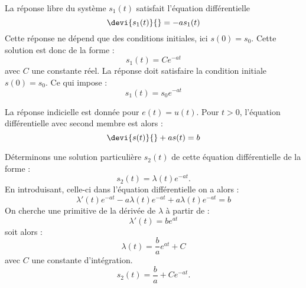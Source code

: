 La réponse libre du système $s_1(t)$ satisfait l'équation différentielle
$$
\devi{s_1(t)}{}=-as_1(t)
$$
Cette réponse ne dépend que des conditions initiales, ici $s(0)=s_0$.
Cette solution est donc de la forme :
$$
s_1(t)=Ce^{-at}
$$
avec $C$ une constante réel. La réponse doit satisfaire la condition initiale $s(0)=s_0$.
Ce qui impose :
$$
s_1(t)=s_0e^{-at}
$$
                                                                                                                                          
La réponse indicielle est donnée pour $e(t)=u(t)$. Pour $t>0$, l'équation différentielle
avec second membre est alors :
$$
\devi{s(t)}{}+as(t)=b
$$
                                                                                                                                          
Déterminons une solution particulière $s_2(t)$ de cette
équation différentielle de la forme :
$$
s_2(t)=\lambda(t)e^{-at}.
$$
En introduisant, celle-ci dans l'équation différentielle on a alors :
$$
\lambda'(t)e^{-at}-a\lambda(t)e^{-at}+a\lambda(t)e^{-at}=b
$$
On cherche une primitive de la dérivée de $\lambda$ à partir de :
$$
\lambda'(t)=be^{at}
$$
soit alors :
$$
\lambda(t)=\dfrac{b}{a}e^{at}+C
$$
avec $C$ une constante d'intégration.
$$
s_2(t)=\dfrac{b}{a}+Ce^{-at}.
$$
                                                                                                                                          
